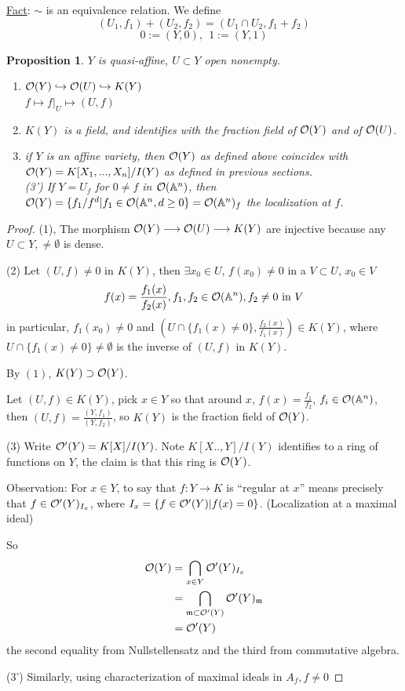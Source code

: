 \documentclass[11pt]{article}
\newtheorem{prop}[thm]{Proposition}
\newcommand{\affn}{\mathbb A}
\newcommand{\scm}{{\mathfrak m}}
\newcommand{\calo}{{\cal O}}
\newcommand{\lrta}{\longrightarrow}
\newcommand{\inj}{\hookrightarrow}
\begin{document}
\underline{Fact}: $\sim$ is an equivalence relation. We define
$$
(U_1,f_1)+(U_2,f_2)=(U_1\cap U_2,f_1+f_2)
$$
$$
0:=(Y,0),\ \ 1:=(Y,1)
$$
\begin{prop}
$Y$ is quasi-affine, $U\subset Y$ open nonempty.
\begin{enumerate}
\item $\calo(Y)\inj\calo(U)\inj K(Y)$\\
$f\longmapsto f|_U\mapsto (U,f)$
\item $K(Y)$ is a field, and identifies with the fraction field of $\calo(Y)$ and of $\calo(U)$.
\item if $Y$ is an affine variety, then $\calo(Y)$ as defined above coincides with $\calo(Y)=K[X_1,...,X_n]/I(Y)$ as defined in previous sections.\\

(3') If $Y=U_f$ for $0\neq f$ in $\calo(\affn^n)$, then $\calo(Y)=\{f_1/f^d|f_1\in \calo(\affn^n, d\geq 0\}=\calo(\affn^n)_f$ the localization at $f$.
\end{enumerate}
\end{prop}
\begin{proof}
(1), The morphism $\calo(Y)\lrta \calo(U)\lrta K(Y)$ are injective because any $U\subset Y,\neq \emptyset$ is dense.

(2) Let $(U,f)\neq 0$ in $K(Y)$, then $\exists x_0\in U$, $f(x_0)\neq 0$ in a $V\subset U$, $x_0\in V$
$$
f(x)=\frac{f_1(x)}{f_2(x)}, f_1,f_2\in\calo(\affn^n), f_2\neq 0\text{ in }V
$$
in particular, $f_1(x_0)\neq 0$ and $( U\cap\{f_1(x)\neq 0\},\frac{f_2(x)}{f_1(x)})\in K(Y)$, where $U\cap\{f_1(x)\neq 0\}\neq \emptyset$ is the inverse of $(U,f)$ in $K(Y)$. 

By $(1)$, $K(Y)\supset \calo(Y)$.

Let $(U,f)\in K(Y)$, pick $x\in Y$ so that around $x$, $f(x)=\frac{f_1}{f_2}$, $f_i\in\calo(\affn^n)$, then $(U,f)=\frac{(Y,f_1)}{(Y,f_2)}$, so $K(Y)$ is the fraction field of $\calo(Y)$.

(3) Write $\calo'(Y)=K[X]/I(Y)$.  Note $K[X..,Y]/I(Y)$ identifies to a ring of functions on $Y$, the claim is that this ring is $\calo(Y)$.

Observation:
For $x\in Y$, to say that $f: Y\lrta K$ is ``regular at $x$'' means precisely that $f\in \calo'(Y)_{I_x}$, where $I_x=\{f\in\calo'(Y)|f(x)=0\}$. (Localization at  a maximal ideal)

So $$
\begin{aligned}
\calo(Y)&=\bigcap_{x\in Y}\calo'(Y)_{I_x}\\
&=\bigcap_{\scm\subset\calo'(Y)}\calo'(Y)_\scm\\
&=\calo'(Y)
\end{aligned}
$$
the second equality from Nullstellensatz and the third from commutative algebra.

(3') Similarly, using characterization of maximal ideals in $A_f, f\neq 0$
\end{proof}
\end{document}

